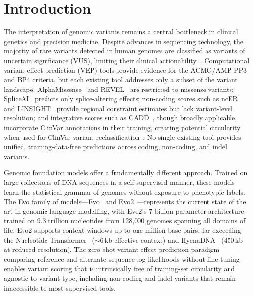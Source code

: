 \section{Introduction}
\label{sec:introduction}

The interpretation of genomic variants remains a central bottleneck in clinical
genetics and precision medicine. Despite advances in sequencing technology,
the majority of rare variants detected in human genomes are classified as
variants of uncertain significance (VUS), limiting their clinical
actionability~\cite{ClinVar_2018,ACMG_2015}. Computational variant effect
prediction (VEP) tools provide evidence for the ACMG/AMP PP3 and BP4 criteria,
but each existing tool addresses only a subset of the variant landscape.
AlphaMissense~\cite{AlphaMissense_2023} and REVEL~\cite{REVEL_2016} are
restricted to missense variants; SpliceAI~\cite{SpliceAI_2019} predicts only
splice-altering effects; non-coding scores such as ncER~\cite{ncER_2019} and LINSIGHT~\cite{LINSIGHT_2017}
provide regional constraint estimates but lack variant-level resolution;
and integrative scores such as CADD~\cite{CADD_2024},
though broadly applicable, incorporate ClinVar annotations in their training,
creating potential circularity when used for ClinVar variant
reclassification~\cite{gnomAD_2020}. No single existing tool provides unified,
training-data-free predictions across coding, non-coding, and indel variants.

Genomic foundation models offer a fundamentally different approach. Trained on
large collections of DNA sequences in a self-supervised manner, these models
learn the statistical grammar of genomes without exposure to phenotypic labels.
The Evo family of models---Evo~\cite{Evo1_2024} and
Evo2~\cite{Evo2_2026}---represents the current state of the art in genomic
language modelling, with Evo2's 7-billion-parameter architecture trained on 9.3
trillion nucleotides from 128,000 genomes spanning all domains of life. Evo2
supports context windows up to one million base pairs, far exceeding the Nucleotide
Transformer~\cite{NT_2024} ($\sim$6\,kb effective context) and
HyenaDNA~\cite{HyenaDNA_2023} (450\,kb at reduced resolution). The zero-shot
variant effect prediction paradigm---comparing reference and alternate sequence
log-likelihoods without fine-tuning---enables variant scoring that is intrinsically
free of training-set circularity and agnostic to variant type, including
non-coding and indel variants that remain inaccessible to most supervised tools.

